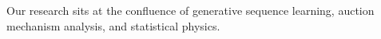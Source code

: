 \documentclass[sigconf, anonymous, review]{acmart}
\begin{document}



Our research sits at the confluence of generative sequence learning, auction mechanism analysis, and statistical physics.
\end{document}
